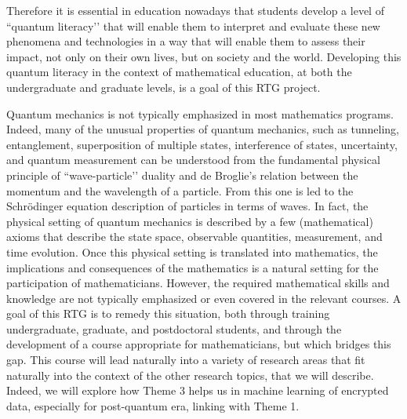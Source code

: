 \documentclass[11pt]{NSFamsart}
\begin{document}
Therefore it is essential in education nowadays that students develop a level of ``quantum literacy’’ \cite{foti2021quantum} that will enable them to interpret and evaluate these new phenomena and technologies in a way that will enable them to assess their impact, not only on their own  lives, but on society and the world. Developing this quantum literacy in the context of mathematical education,    at both the undergraduate and graduate   levels,  is a goal of this RTG project.


Quantum mechanics is not typically emphasized in most mathematics programs.  Indeed, many of the unusual properties of quantum mechanics, such as tunneling, entanglement, superposition of multiple states, interference of states, uncertainty, and quantum measurement can be understood from the fundamental physical principle of ``wave-particle’’ duality and de Broglie’s relation between the momentum and the wavelength of a particle.  From this one is led to the Schr\"{o}dinger equation description of particles in terms of waves. In fact, the physical setting of quantum mechanics is described by a few (mathematical) axioms that describe the state space, observable quantities, measurement, and time evolution.  Once this physical setting is translated into mathematics, the implications and consequences of the mathematics is a natural setting for the participation of mathematicians. However, the required mathematical skills and knowledge are not typically emphasized or even covered in the relevant courses. A goal of this RTG is to remedy this situation, both through training undergraduate, graduate, and postdoctoral students, and through the development of a course appropriate for mathematicians, but which bridges this gap. This course will lead naturally into a variety of research areas that fit naturally into the context of the other research topics, that we will describe. Indeed, we will explore how   Theme 3 helps us in machine learning of encrypted data, especially for post-quantum era, linking with Theme 1.  
\end{document}
